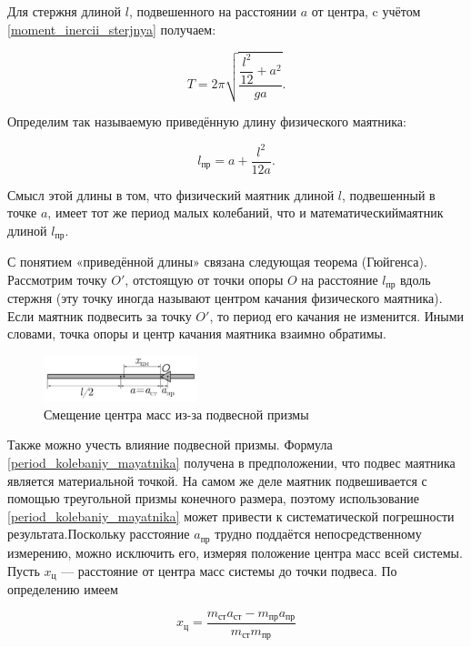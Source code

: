 \documentclass[a4paper,12pt]{article}
\begin{document}
Для стержня длиной $l$, подвешенного на расстоянии $a$ от центра, c учётом \eqref{moment_inercii_sterjnya} получаем:

\begin{equation}\label{period_kolebaniy_mayatnika}
T = 2\pi\sqrt{\dfrac{ \dfrac{l^2}{12} + a^2 }{ga}}.
\end{equation}


Определим так называемую приведённую длину физического маятника:

\begin{equation}\label{prived_dlina}
l_{\text{пр}} = a + \dfrac{l^2}{12a}.
\end{equation}

Смысл этой длины в том, что физический маятник длиной $l$, подвешенный в точке $a$, имеет тот же период малых колебаний, что и математическиймаятник длиной $l_{\text{пр}}$.


С понятием «приведённой длины» связана следующая теорема (Гюйгенса). Рассмотрим точку $O'$, отстоящую от точки опоры $O$ на расстояние $l_{\text{пр}}$ вдоль стержня (эту точку иногда называют центром качания физического маятника). Если маятник подвесить за точку $O'$, то период его качания не изменится. Иными словами, точка опоры и центр качания маятника взаимно обратимы.


\begin{figure}
\includegraphics[width=0.4\textwidth]{smeschenie_CM.png}
\caption{Смещение центра масс из-за подвесной призмы} \label{smeschenie_CM}
\end{figure}


Также можно учесть влияние подвесной призмы. Формула \eqref{period_kolebaniy_mayatnika} получена в предположении, что подвес маятника является материальной точкой. На самом же деле маятник подвешивается с помощью треугольной призмы конечного размера, поэтому использование \eqref{period_kolebaniy_mayatnika} может привести к систематической погрешности результата.Поскольку расстояние $a_{\text{пр}}$ трудно поддаётся непосредственному измерению, можно исключить его, измеряя положение центра масс всей системы. Пусть $x_{\text{ц}}$ — расстояние от центра масс системы до точки подвеса. По определению имеем

\[ x_{\text{ц}} = \dfrac{ m_{\text{ст}}a_{\text{ст}} - m_{\text{пр}}a_{\text{пр}} }{ m_{\text{ст}}m_{\text{пр}} } \]
\end{document}
